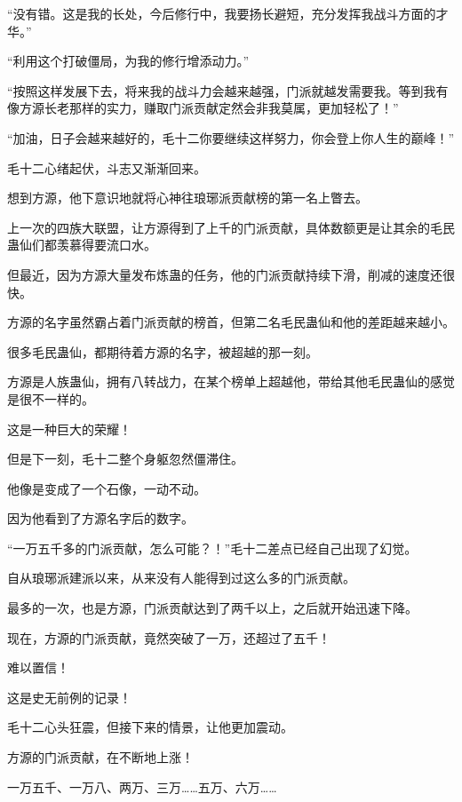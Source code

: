 
\begin{this_body}



“没有错。这是我的长处，今后修行中，我要扬长避短，充分发挥我战斗方面的才华。”

“利用这个打破僵局，为我的修行增添动力。”

“按照这样发展下去，将来我的战斗力会越来越强，门派就越发需要我。等到我有像方源长老那样的实力，赚取门派贡献定然会非我莫属，更加轻松了！”

“加油，日子会越来越好的，毛十二你要继续这样努力，你会登上你人生的巅峰！”

毛十二心绪起伏，斗志又渐渐回来。

想到方源，他下意识地就将心神往琅琊派贡献榜的第一名上瞥去。

上一次的四族大联盟，让方源得到了上千的门派贡献，具体数额更是让其余的毛民蛊仙们都羡慕得要流口水。

但最近，因为方源大量发布炼蛊的任务，他的门派贡献持续下滑，削减的速度还很快。

方源的名字虽然霸占着门派贡献的榜首，但第二名毛民蛊仙和他的差距越来越小。

很多毛民蛊仙，都期待着方源的名字，被超越的那一刻。

方源是人族蛊仙，拥有八转战力，在某个榜单上超越他，带给其他毛民蛊仙的感觉是很不一样的。

这是一种巨大的荣耀！

但是下一刻，毛十二整个身躯忽然僵滞住。

他像是变成了一个石像，一动不动。

因为他看到了方源名字后的数字。

“一万五千多的门派贡献，怎么可能？！”毛十二差点已经自己出现了幻觉。

自从琅琊派建派以来，从来没有人能得到过这么多的门派贡献。

最多的一次，也是方源，门派贡献达到了两千以上，之后就开始迅速下降。

现在，方源的门派贡献，竟然突破了一万，还超过了五千！

难以置信！

这是史无前例的记录！

毛十二心头狂震，但接下来的情景，让他更加震动。

方源的门派贡献，在不断地上涨！

一万五千、一万八、两万、三万……五万、六万……


\end{this_body}
